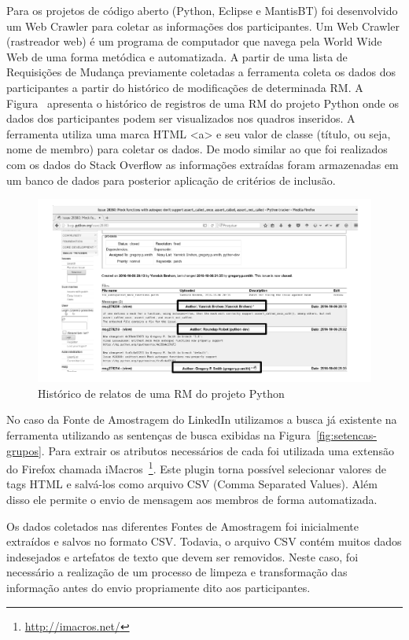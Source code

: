 Para os projetos de código aberto (Python, Eclipse e MantisBT) foi desenvolvido
um Web Crawler para coletar as informações dos participantes. Um Web Crawler
(rastreador web) é um programa de computador que navega pela World Wide Web de
uma forma metódica e automatizada. A partir de uma lista de Requisições de
Mudança previamente coletadas a ferramenta coleta os dados dos participantes a
partir do histórico de modificações de determinada RM\@. A
Figura~\cite{fig:historico-rm-python} apresenta o histórico de registros de uma
RM do projeto Python onde os dados dos participantes podem ser visualizados nos
quadros inseridos. A ferramenta utiliza uma marca HTML <a> e seu valor de
classe (título, ou seja, nome de membro) para coletar os dados. De modo similar
ao que foi realizados com os dados do Stack Overflow as informações extraídas
foram armazenadas em um banco de dados para posterior aplicação de critérios de
inclusão.

\begin{figure}[htpb]
	\centering
	\includegraphics[width=0.8\linewidth]{./chapter-pesquisa-com-profissionais/img/historico-rm-python.pdf}
	\caption{Histórico de relatos de uma RM do projeto Python}
\label{fig:historico-rm-python}
\end{figure}

No caso da Fonte de Amostragem do LinkedIn utilizamos a busca já existente na
ferramenta utilizando as sentenças de busca exibidas na
Figura~\ref{fig:setencas-grupos}. Para extrair os atributos necessários de cada
foi utilizada uma extensão do Firefox chamada
iMacros~\footnote{\url{http://imacros.net/}}.  Este plugin torna possível
selecionar valores de tags HTML e salvá-los como arquivo CSV (Comma Separated
Values). Além disso ele permite o envio de mensagem aos membros de forma
automatizada.

Os dados coletados nas diferentes Fontes de Amostragem foi inicialmente
extraídos e salvos no formato CSV\@. Todavia, o arquivo CSV contém muitos dados
indesejados e artefatos de texto que devem ser removidos. Neste caso, foi
necessário a realização de um processo de limpeza e transformação das informação
antes do envio propriamente dito aos participantes.

